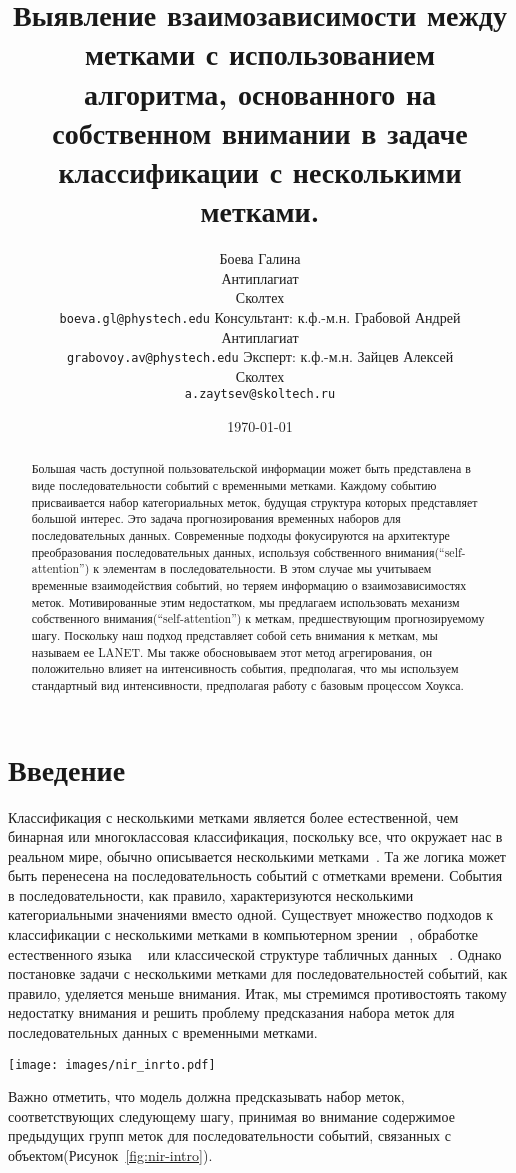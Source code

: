 \documentclass[a4paper, 12pt]{article} %
\title{Выявление взаимозависимости между метками с использованием алгоритма, основанного на собственном внимании в задаче классификации с несколькими метками.}
\author{ Боева Галина\\
	Антиплагиат\\
	Сколтех\\ 
	\texttt{boeva.gl@phystech.edu} 
	\AND
        Консультант: к.ф.-м.н. Грабовой Андрей\\
	Антиплагиат\\
	\texttt{grabovoy.av@phystech.edu} 
        \AND
        Эксперт: к.ф.-м.н. Зайцев Алексей\\
	Сколтех\\
	\texttt{a.zaytsev@skoltech.ru}
}
\date{\today}
\begin{document}
\maketitle

\begin{abstract}
Большая часть доступной пользовательской информации может быть представлена в виде последовательности событий с временными метками. Каждому событию присваивается набор категориальных меток, будущая структура которых представляет большой интерес. Это задача прогнозирования временных наборов для последовательных данных. Современные подходы фокусируются на архитектуре преобразования последовательных данных, используя собственного внимания(``self-attention'') к элементам в последовательности. В этом случае мы учитываем временные взаимодействия событий, но теряем информацию о взаимозависимостях меток. Мотивированные этим недостатком, мы предлагаем использовать механизм собственного внимания(``self-attention'') к меткам, предшествующим прогнозируемому шагу. Поскольку наш подход представляет собой сеть внимания к меткам, мы называем ее LANET. Мы также обосновываем этот метод агрегирования, он положительно влияет на интенсивность события, предполагая, что мы используем стандартный вид интенсивности, предполагая работу с базовым процессом Хоукса.
\end{abstract}



\section{Введение}
Классификация с несколькими метками является более естественной, чем бинарная или многоклассовая классификация, поскольку все, что окружает нас в реальном мире, обычно описывается несколькими метками~\cite{liu2021emerging}. Та же логика может быть перенесена на последовательность событий с отметками времени. События в последовательности, как правило, характеризуются несколькими категориальными значениями вместо одной. Существует множество подходов к классификации с несколькими метками в компьютерном зрении ~\cite{durand2019learning}, обработке естественного языка ~\cite{xiao2019label} или классической структуре табличных данных ~\cite{tarekegn2021review}. Однако постановке задачи с несколькими метками для последовательностей событий, как правило, уделяется меньше внимания. Итак, мы стремимся противостоять такому недостатку внимания и решить проблему предсказания набора меток для последовательных данных с временными метками.  
\begin{figure*}
    \centering
    \texttt{[image: images/nir\_inrto.pdf]}
    \caption{На рисунке показано визуальное представление постановки задачи. Наша модель должна предсказать метки для момента времени $t_4$, учитывая историю предыдущих наборов меток. Требуется предсказать несколько меток, так что это определение задачи классификации с несколькими метками.}
    \label{fig:nir-intro}
\end{figure*}
Важно отметить, что модель должна предсказывать набор меток, соответствующих следующему шагу, принимая во внимание содержимое предыдущих групп меток для последовательности событий, связанных с объектом(Рисунок~\ref{fig:nir-intro}).
\end{document}
